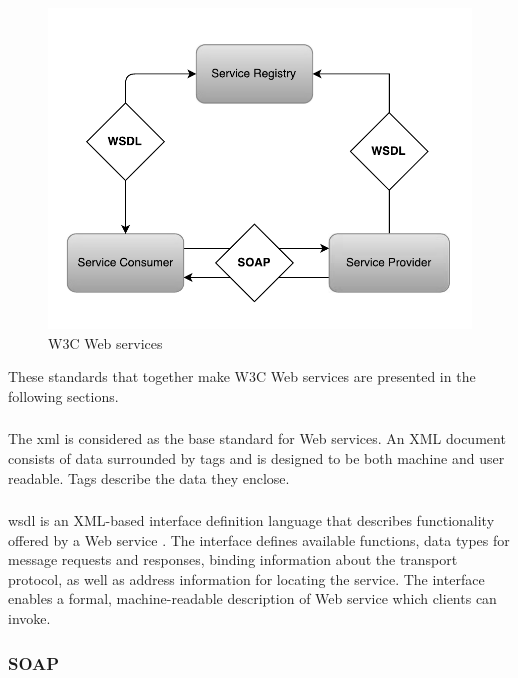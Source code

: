 \begin{figure}[h]
\centering
\includegraphics[scale=0.4]{images/web_services.png}
\caption{W3C Web services}
\label{figure-w3c-web-services}
\end{figure}

These standards that together make W3C Web services are presented in the
following sections.

\subsubsection{}

The \gls{xml}\cite{W3C-XML} is considered as the base standard for Web services.
An XML document consists of data surrounded by tags and is designed to be both
machine and user readable. Tags describe the data they enclose.


\subsubsection{}

\gls{wsdl} is an XML-based interface definition language that describes
functionality offered by a Web service \cite{w3c-wsdl}. The interface defines
available functions, data types for message requests and responses, binding
information about the transport protocol, as well as address information for
locating the service. The interface enables a formal, machine-readable
description of Web service which clients can invoke.

\subsubsection{SOAP}


